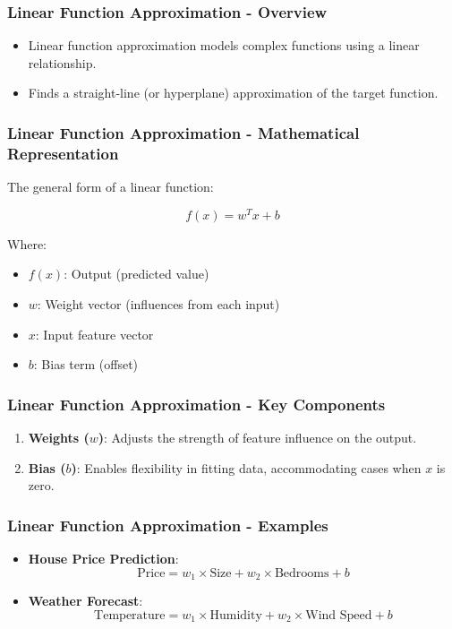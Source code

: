 \documentclass[aspectratio=169]{beamer}
\begin{document}
\begin{frame}[fragile]
    \frametitle{Linear Function Approximation - Overview}
    \begin{itemize}
        \item Linear function approximation models complex functions using a linear relationship.
        \item Finds a straight-line (or hyperplane) approximation of the target function.
    \end{itemize}
\end{frame}

\begin{frame}[fragile]
    \frametitle{Linear Function Approximation - Mathematical Representation}
    The general form of a linear function:

    \begin{equation}
        f(x) = w^T x + b
    \end{equation}

    Where:
    \begin{itemize}
        \item \( f(x) \): Output (predicted value)
        \item \( w \): Weight vector (influences from each input)
        \item \( x \): Input feature vector
        \item \( b \): Bias term (offset)
    \end{itemize}
\end{frame}

\begin{frame}[fragile]
    \frametitle{Linear Function Approximation - Key Components}
    \begin{enumerate}
        \item \textbf{Weights (\(w\))}: Adjusts the strength of feature influence on the output.
        \item \textbf{Bias (\(b\))}: Enables flexibility in fitting data, accommodating cases when \(x\) is zero.
    \end{enumerate}
\end{frame}

\begin{frame}[fragile]
    \frametitle{Linear Function Approximation - Examples}
    \begin{itemize}
        \item \textbf{House Price Prediction}:
        \begin{equation}
            \text{Price} = w_1 \times \text{Size} + w_2 \times \text{Bedrooms} + b
        \end{equation}
        
        \item \textbf{Weather Forecast}:
        \begin{equation}
            \text{Temperature} = w_1 \times \text{Humidity} + w_2 \times \text{Wind Speed} + b
        \end{equation}
    \end{itemize}
\end{frame}
\end{document}
